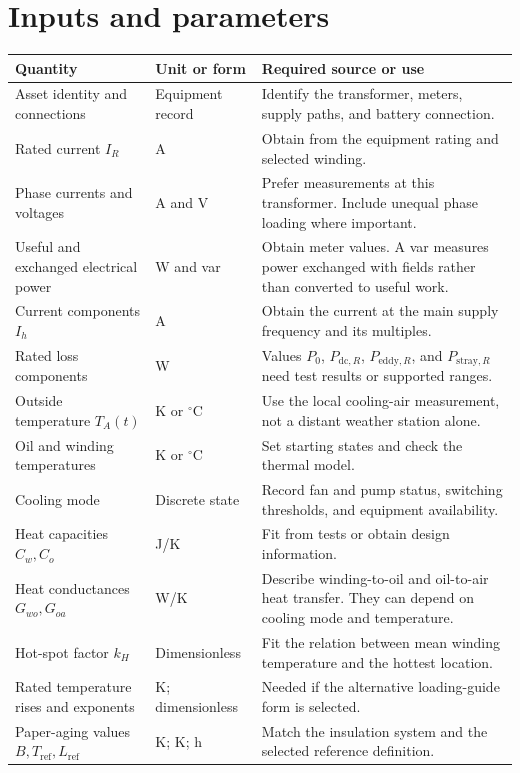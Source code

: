 \documentclass[11pt,a4paper]{report}
\begin{document}
\section{Inputs and parameters}
\begin{longtable}{L{0.21\textwidth}L{0.21\textwidth}L{0.46\textwidth}}
\toprule Quantity & Unit or form & Required source or use \\ \midrule\endhead
Asset identity and connections & Equipment record & Identify the transformer, meters, supply paths, and battery connection. \\
Rated current $I_R$ & A & Obtain from the equipment rating and selected winding. \\
Phase currents and voltages & A and V & Prefer measurements at this transformer. Include unequal phase loading where important. \\
Useful and exchanged electrical power & W and var & Obtain meter values. A var measures power exchanged with fields rather than converted to useful work. \\
Current components $I_h$ & A & Obtain the current at the main supply frequency and its multiples. \\
Rated loss components & W & Values $P_0$, $P_{\mathrm{dc},R}$, $P_{\mathrm{eddy},R}$, and $P_{\mathrm{stray},R}$ need test results or supported ranges. \\
Outside temperature $T_A(t)$ & K or $^{\circ}$C & Use the local cooling-air measurement, not a distant weather station alone. \\
Oil and winding temperatures & K or $^{\circ}$C & Set starting states and check the thermal model. \\
Cooling mode & Discrete state & Record fan and pump status, switching thresholds, and equipment availability. \\
Heat capacities $C_w,C_o$ & J/K & Fit from tests or obtain design information. \\
Heat conductances $G_{wo},G_{oa}$ & W/K & Describe winding-to-oil and oil-to-air heat transfer. They can depend on cooling mode and temperature. \\
Hot-spot factor $k_H$ & Dimensionless & Fit the relation between mean winding temperature and the hottest location. \\
Rated temperature rises and exponents & K; dimensionless & Needed if the alternative loading-guide form is selected. \\
Paper-aging values $B,T_{\mathrm{ref}},L_{\mathrm{ref}}$ & K; K; h & Match the insulation system and the selected reference definition. \\

\end{longtable}
\end{document}
